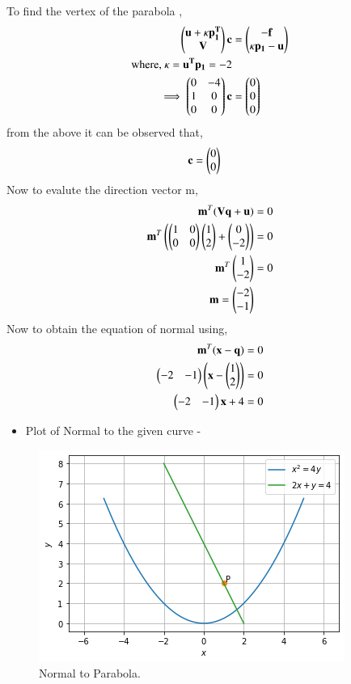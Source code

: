 \documentclass[journal,12pt,twocolumn]{IEEEtran}
\begin{document}
To find the vertex of the parabola ,
\begin{align} \begin{pmatrix}\mathbf{u}+\kappa\mathbf{p_1^T}\\\mathbf{V} \end{pmatrix}\mathbf{c} &= \begin{pmatrix}\mathbf{-f}\\\kappa \mathbf{p_1} -\mathbf{u}\end{pmatrix}
\\
\text{where, }  \kappa = \mathbf{u^T}\mathbf{p_1} = -2
\\
\implies\begin{pmatrix}0 & -4\\1 & 0 \\0 & 0\end{pmatrix} \mathbf{c}&= \begin{pmatrix}0\\0\\0\end{pmatrix} \label{eq:b}
\end{align}
from the above it can be observed that,
\begin{align}    
   \mathbf{c} &= \begin{pmatrix}0 \\ 0\end{pmatrix}
\end{align}
Now to evalute the direction vector m,
\begin{align}
\mathbf{m}^T(\mathbf{V}\mathbf{q} + \mathbf{u}) &=0
\\
\mathbf{m}^T\left(\begin{pmatrix}1 & 0 \\ 0 & 0\end{pmatrix}\begin{pmatrix}1 \\ 2\end{pmatrix} + \begin{pmatrix}0 \\ -2\end{pmatrix}\right) &=0
\\
\mathbf{m}^T\begin{pmatrix}1 \\ -2\end{pmatrix} &=0
\\
\mathbf{m} = \begin{pmatrix}-2 \\ -1\end{pmatrix}
\end{align}
Now to obtain the equation of normal using,
\begin{align}
\mathbf{m}^T(\mathbf{x} - \mathbf{q}) &=0 
\\
\begin{pmatrix}-2 & -1\end{pmatrix}\left(\mathbf{x}-\begin{pmatrix}1 \\ 2\end{pmatrix}\right) &= 0
\\
\begin{pmatrix}-2 & -1\end{pmatrix}\mathbf{x}+ 4 &= 0 
\end{align}
\begin{itemize}
\item Plot of Normal to the given curve -
\end{itemize}
\begin{figure}[ht]
    \centering
    \includegraphics[width=\columnwidth]{FIGURE4.png}
    \caption{Normal to Parabola.}
    \label{fig:Normal to parabola.}
\end{figure}    
\end{document}
